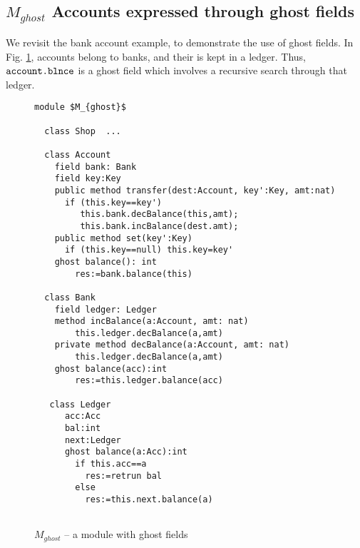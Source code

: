 \subsection{ $M_{ghost}$ Accounts expressed through ghost fields}

\label{app:BankAccount:ghost}

 
We   revisit the bank account example, to demonstrate the use of ghost fields.
In Fig. \ref{f:ex-bank-short}, accounts belong to banks, and their \prg{\balance} is  kept in a ledger. 
Thus, $\mbox{\normalfont{\texttt{account.\mbox{\normalfont{\texttt{blnce}}}}}}$ is a ghost field which involves a recursive search through that ledger.


\begin{figure}[h]
\begin{lstlisting}[language=chainmail, mathescape=true, frame=lines]
module $M_{ghost}$ 
  
  class Shop  ...
  
  class Account
    field bank: Bank
    field key:Key
    public method transfer(dest:Account, key':Key, amt:nat)
      if (this.key==key') 
         this.bank.decBalance(this,amt); 
         this.bank.incBalance(dest.amt);
    public method set(key':Key)
      if (this.key==null) this.key=key'
    ghost balance(): int
        res:=bank.balance(this)
        
  class Bank
    field ledger: Ledger
    method incBalance(a:Account, amt: nat)
        this.ledger.decBalance(a,amt)
    private method decBalance(a:Account, amt: nat)
        this.ledger.decBalance(a,amt)   
    ghost balance(acc):int 
        res:=this.ledger.balance(acc)
        
   class Ledger
      acc:Acc
      bal:int
      next:Ledger
      ghost balance(a:Acc):int 
        if this.acc==a 
          res:=retrun bal
        else
          res:=this.next.balance(a)
      
\end{lstlisting}
\caption{$M_{ghost}$  -- a module with ghost fields}
\label{f:ex-bank-short}
\end{figure}
 
 
